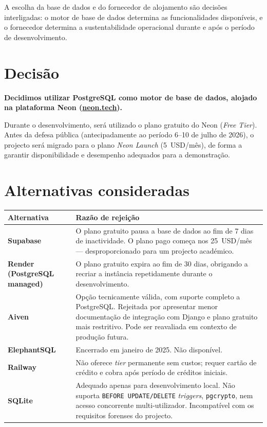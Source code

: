 \documentclass[a4paper,11pt]{article}
\begin{document}
A escolha da base de dados e do fornecedor de alojamento são decisões
interligadas: o motor de base de dados determina as funcionalidades
disponíveis, e o fornecedor determina a sustentabilidade operacional durante
e após o período de desenvolvimento.

\section{Decisão}

\textbf{Decidimos utilizar PostgreSQL como motor de base de dados, alojado na
plataforma Neon (\href{https://neon.tech}{neon.tech}).}

Durante o desenvolvimento, será utilizado o plano gratuito do Neon
(\emph{Free Tier}). Antes da defesa pública (antecipadamente ao período
6--10 de julho de 2026), o projecto será migrado para o plano \emph{Neon
Launch} (5~USD/mês), de forma a garantir disponibilidade e desempenho
adequados para a demonstração.

\section{Alternativas consideradas}

\begin{longtable}{L{3.5cm} L{10.5cm}}
    \toprule
    \textbf{Alternativa} & \textbf{Razão de rejeição} \\
    \midrule
    \endhead
    \textbf{Supabase}
        & O plano gratuito pausa a base de dados ao fim de 7 dias de
          inactividade. O plano pago começa nos 25~USD/mês ---
          desproporcionado para um projecto académico. \\[0.5em]
    \textbf{Render (PostgreSQL managed)}
        & O plano gratuito expira ao fim de 30 dias, obrigando a recriar a
          instância repetidamente durante o desenvolvimento. \\[0.5em]
    \textbf{Aiven}
        & Opção tecnicamente válida, com suporte completo a PostgreSQL.
          Rejeitada por apresentar menor documentação de integração com
          Django e plano gratuito mais restritivo. Pode ser reavaliada em
          contexto de produção futura. \\[0.5em]
    \textbf{ElephantSQL}
        & Encerrado em janeiro de 2025. Não disponível. \\[0.5em]
    \textbf{Railway}
        & Não oferece \emph{tier} permanente sem custos; requer cartão de
          crédito e cobra após período de créditos iniciais. \\[0.5em]
    \textbf{SQLite}
        & Adequado apenas para desenvolvimento local. Não suporta
          \texttt{BEFORE UPDATE/DELETE} \emph{triggers}, \texttt{pgcrypto},
          nem acesso concorrente multi-utilizador. Incompatível com os
          requisitos forenses do projecto. \\
    \bottomrule
\end{longtable}
\end{document}
